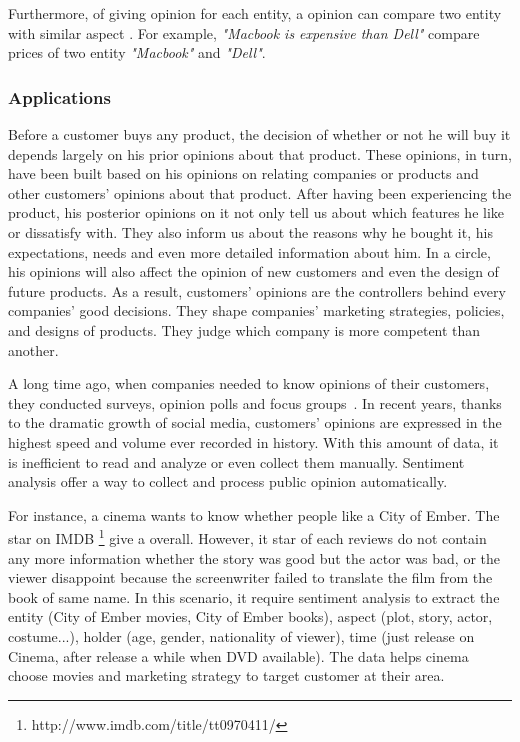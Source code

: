  Furthermore, of giving opinion for each entity, a opinion can compare two entity with similar aspect \cite{jindal2006mining}. For example, \textit{"Macbook is expensive than Dell"} compare prices of two entity \textit{"Macbook"} and \textit{"Dell"}. 

\subsubsection{Applications}
Before a customer buys any product, the decision of whether or not he will buy it depends largely on his prior opinions about that product. 
These opinions, in turn, have been built based on his opinions on relating companies or products and other customers' opinions about that product.  
After having been experiencing the product, his posterior opinions on it not only tell us about which features he like or dissatisfy with.
They also inform us about the reasons why he bought it, his expectations, needs and even more detailed information about him.
In a circle, his opinions will also affect the opinion of new customers and even the design of future products.
As a result, customers' opinions are the controllers behind every companies' good decisions. 
They shape companies' marketing strategies, policies, and designs of products.
They judge which company is more competent than another.

A long time ago, when companies needed to know opinions of their customers, they conducted surveys, opinion polls and focus groups~\cite{liu2012sentiment}. 
In recent years, thanks to the dramatic growth of social media, customers' opinions are expressed in the highest speed and volume ever recorded in history.
With this amount of data, it is inefficient to read and analyze or even collect them manually. Sentiment analysis offer a way to collect and process public opinion automatically. 

For instance, a cinema wants to know whether people like a City of Ember. The star on IMDB \footnote{http://www.imdb.com/title/tt0970411/} give a overall. However, it star of each reviews do not contain any more information whether the story was good but the actor was bad, or the viewer disappoint because the screenwriter failed to translate the film from the book of same name. In this scenario, it require sentiment analysis to extract the entity (City of Ember movies, City of Ember books), aspect (plot, story, actor, costume...), holder (age, gender, nationality of viewer), time (just release on Cinema, after release a while when DVD available). The data helps cinema choose movies and marketing strategy to target customer at their area.



